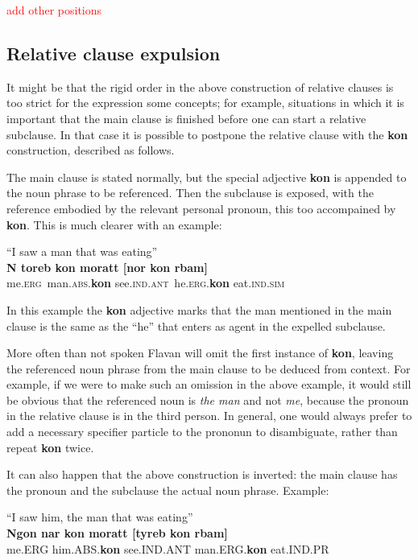 \documentclass[10pt,oneside]{memoir}
\newcommand{\cmmnt}[1]{\textcolor{red}{#1}}
\newcommand{\grammar}[1]{\textsc{#1}}
\newcommand{\ERG}{\grammar{erg}}
\newcommand{\ABS}{\grammar{abs}}
\newcommand{\SIM}{\grammar{sim}}
\newcommand{\ANT}{\grammar{ant}}
\newcommand{\IND}{\grammar{ind}}
\begin{document}
\cmmnt{add other positions}

\subsection{Relative clause expulsion}

It might be that the rigid order in the above construction of relative clauses is too strict for the expression some concepts; for example, situations in which it is important that the main clause is finished before one can start a relative subclause. In that case it is possible to postpone the relative clause with the \textbf{kon} construction, described as follows.

The main clause is stated normally, but the special adjective \textbf{kon} is appended to the noun phrase to be referenced. Then the subclause is exposed, with the reference embodied by the relevant personal pronoun, this too accompained by \textbf{kon}. This is much clearer with an example:

\begin{center}
    ``I saw a man that was eating''\\
    \textbf{N toreb kon moratt [nor kon rbam]}\\
    me.\ERG\ man.\ABS.\textbf{kon} see.\IND.\ANT\ he.\ERG.\textbf{kon} eat.\IND.\SIM
\end{center}

In this example the \textbf{kon} adjective marks that the man mentioned in the main clause is the same as the ``he'' that enters as agent in the expelled subclause.

More often than not spoken Flavan will omit the first instance of \textbf{kon}, leaving the referenced noun phrase from the main clause to be deduced from context. For example, if we were to make such an omission in the above example, it would still be obvious that the referenced noun is \emph{the man} and not \emph{me}, because the pronoun in the relative clause is in the third person. In general, one would always prefer to add a necessary specifier particle to the prononun to disambiguate, rather than repeat \textbf{kon} twice.

It can also happen that the above construction is inverted: the main clause has the pronoun and the subclause the actual noun phrase. Example:

\begin{center}
    ``I saw him, the man that was eating''\\
    \textbf{Ngon nar kon moratt [tyreb kon rbam]}\\
    me.ERG him.ABS.\textbf{kon} see.IND.ANT man.ERG.\textbf{kon} eat.IND.PR
\end{center}
\end{document}

